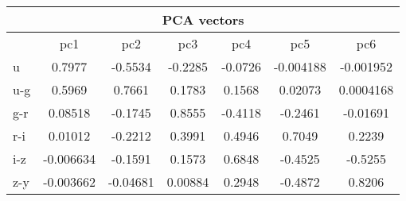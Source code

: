 \documentclass[13pt]{amsart}
\begin{document}

    \begin{center}
    \begin{tabular}{|l|c|c|c|c|c|c|}
      \multicolumn{7}{c}{PCA vectors} \\ \hline
      & pc1 & pc2 & pc3 & pc4 & pc5 & pc6 \\ \hline
      u &  0.7977 & -0.5534 & -0.2285 & -0.0726 & -0.004188 & -0.001952 \\ \hline
      u-g &  0.5969 & 0.7661 & 0.1783 & 0.1568 & 0.02073 & 0.0004168 \\ \hline
      g-r &  0.08518 & -0.1745 & 0.8555 & -0.4118 & -0.2461 & -0.01691 \\ \hline
      r-i &  0.01012 & -0.2212 & 0.3991 & 0.4946 & 0.7049 & 0.2239 \\ \hline
      i-z &  -0.006634 & -0.1591 & 0.1573 & 0.6848 & -0.4525 & -0.5255 \\ \hline
      z-y &  -0.003662 & -0.04681 & 0.00884 & 0.2948 & -0.4872 & 0.8206 \\ \hline
    \end{tabular}
    \end{center}
\end{document}
